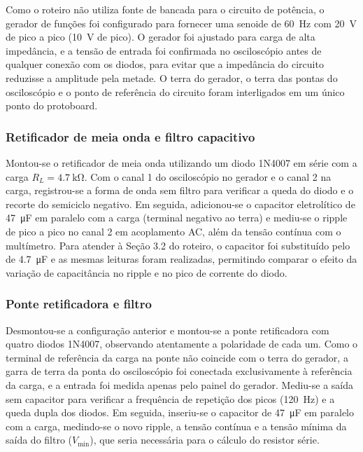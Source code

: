 \documentclass[11pt,a4paper]{article}
\begin{document}
Como o roteiro não utiliza fonte de bancada para o circuito de potência, o gerador de funções foi configurado para fornecer uma senoide de \SI{60}{\hertz} com \SI{20}{\volt} de pico a pico (\SI{10}{\volt} de pico). O gerador foi ajustado para carga de alta impedância, e a tensão de entrada foi confirmada no osciloscópio antes de qualquer conexão com os diodos, para evitar que a impedância do circuito reduzisse a amplitude pela metade. O terra do gerador, o terra das pontas do osciloscópio e o ponto de referência do circuito foram interligados em um único ponto do protoboard.
 
\subsubsection{Retificador de meia onda e filtro capacitivo}
 
Montou-se o retificador de meia onda utilizando um diodo 1N4007 em série com a carga $R_L = \SI{4,7}{\kilo\ohm}$. Com o canal 1 do osciloscópio no gerador e o canal 2 na carga, registrou-se a forma de onda sem filtro para verificar a queda do diodo e o recorte do semiciclo negativo. Em seguida, adicionou-se o capacitor eletrolítico de \SI{47}{\micro\farad} em paralelo com a carga (terminal negativo ao terra) e mediu-se o ripple de pico a pico no canal 2 em acoplamento AC, além da tensão contínua com o multímetro. Para atender à Seção 3.2 do roteiro, o capacitor foi substituído pelo de \SI{4,7}{\micro\farad} e as mesmas leituras foram realizadas, permitindo comparar o efeito da variação de capacitância no ripple e no pico de corrente do diodo.
 
\subsubsection{Ponte retificadora e filtro}
 
Desmontou-se a configuração anterior e montou-se a ponte retificadora com quatro diodos 1N4007, observando atentamente a polaridade de cada um. Como o terminal de referência da carga na ponte não coincide com o terra do gerador, a garra de terra da ponta do osciloscópio foi conectada exclusivamente à referência da carga, e a entrada foi medida apenas pelo painel do gerador. Mediu-se a saída sem capacitor para verificar a frequência de repetição dos picos (\SI{120}{\hertz}) e a queda dupla dos diodos. Em seguida, inseriu-se o capacitor de \SI{47}{\micro\farad} em paralelo com a carga, medindo-se o novo ripple, a tensão contínua e a tensão mínima da saída do filtro ($V_{\min}$), que seria necessária para o cálculo do resistor série.
 
\end{document}
